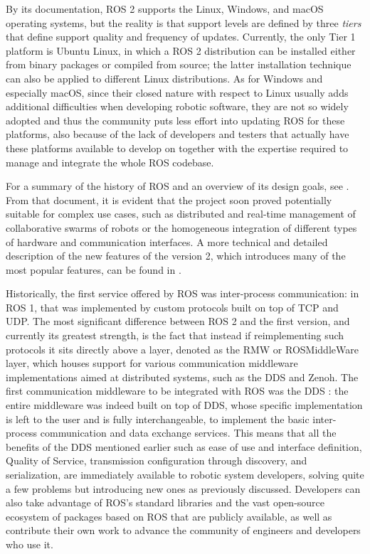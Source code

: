 By its documentation, ROS 2 supports the Linux, Windows, and macOS operating systems, but the reality is that support levels are defined by three \emph{tiers} that define support quality and frequency of updates. Currently, the only Tier 1 platform is Ubuntu Linux, in which a ROS 2 distribution can be installed either from binary packages or compiled from source; the latter installation technique can also be applied to different Linux distributions. As for Windows and especially macOS, since their closed nature with respect to Linux usually adds additional difficulties when developing robotic software, they are not so widely adopted and thus the community puts less effort into updating ROS for these platforms, also because of the lack of developers and testers that actually have these platforms available to develop on together with the expertise required to manage and integrate the whole ROS codebase.

For a summary of the history of ROS and an overview of its design goals, see \cite{gerkey_why_2014}. From that document, it is evident that the project soon proved potentially suitable for complex use cases, such as distributed and real-time management of collaborative swarms of robots or the homogeneous integration of different types of hardware and communication interfaces. A more technical and detailed description of the new features of the version 2, which introduces many of the most popular features, can be found in \cite{thomas_changes_2015}.

Historically, the first service offered by ROS was inter-process communication: in ROS 1, that was implemented by custom protocols built on top of TCP and UDP. The most significant difference between ROS 2 and the first version, and currently its greatest strength, is the fact that instead if reimplementing such protocols it sits directly above a layer, denoted as the RMW or ROSMiddleWare layer, which houses support for various communication middleware implementations aimed at distributed systems, such as the DDS and Zenoh. The first communication middleware to be integrated with ROS was the DDS \cite{woodall_ros_2014}: the entire middleware was indeed built on top of DDS, whose specific implementation is left to the user and is fully interchangeable, to implement the basic inter-process communication and data exchange services. This means that all the benefits of the DDS mentioned earlier such as ease of use and interface definition, Quality of Service, transmission configuration through discovery, and serialization, are immediately available to robotic system developers, solving quite a few problems but introducing new ones as previously discussed. Developers can also take advantage of ROS's standard libraries and the vast open-source ecosystem of packages based on ROS that are publicly available, as well as contribute their own work to advance the community of engineers and developers who use it.

